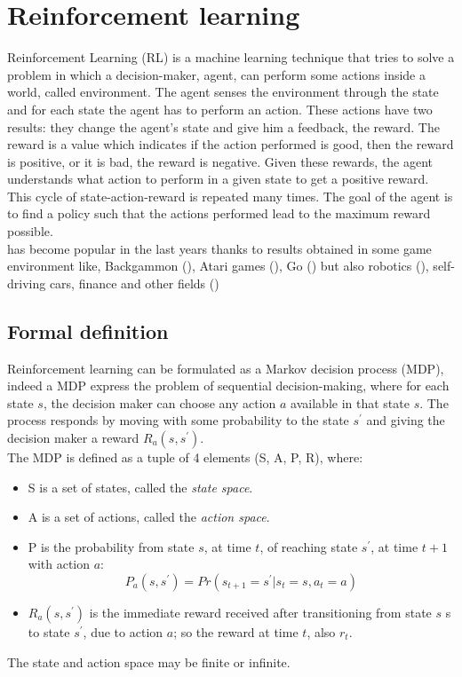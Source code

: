 \section{Reinforcement learning}
\label{sec:rl}
Reinforcement Learning (\gls{RL}) is a machine learning technique that tries to solve a problem in which a decision-maker, agent, can perform some actions inside a world, called environment. The agent senses the environment through the state and for each state the agent has to perform an action. These actions have two results: they change the agent's state and give him a feedback, the reward. The reward is a value which indicates if the action performed is good, then the reward is positive, or it is bad, the reward is negative. Given these rewards, the agent understands what action to perform in a given state to get a positive reward. This cycle of state-action-reward is repeated many times. The goal of the agent is to find a policy such that the actions performed lead to the maximum reward possible.\\

 has become popular in the last years thanks to results obtained in some game environment like, Backgammon (\cite{rlback}), Atari games (\cite{rlatari}), Go (\cite{rlgo}) but also robotics (\cite{rlrob}), self-driving cars, finance and other fields (\cite{rlappl})


\subsection{Formal definition}
\label{ssec:formdefRL}
Reinforcement learning can be formulated as a Markov decision process (\gls{MDP}), indeed a \gls{MDP} express the problem of sequential decision-making, where for each state $s$, the decision maker can choose any action $a$ available in that state $s$. The process responds by moving with some probability to the state $s^\prime$ and giving the decision maker a reward $R_a(s,s^\prime)$. %
\\
The \gls{MDP} is defined as a tuple of 4 elements (S, A, P, R), where:
\begin{itemize}
\item S is a set of states, called the \emph{state space}.
\item A is a set of actions, called the \emph{action space}.
\item P is the probability from state $s$, at time $t$, of reaching state $s^\prime$, at time $t+1$ with action $a$:
\[P_a(s,s^\prime) = Pr(s_{t+1} = s^\prime | s_t = s, a_t = a)\]
\item $R_a(s,s^\prime)$ is the immediate reward received after transitioning from state $s$ s to state $s^\prime$, due to action $a$; so the reward at time $t$, also $r_t$.
\end{itemize}
The state and action space may be finite or infinite.\\

